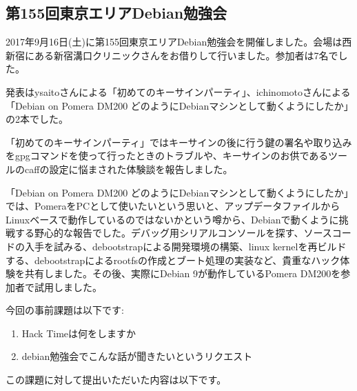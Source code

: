 \documentclass[mingoth,a4paper]{jsarticle}
\begin{document}

\subsection{第155回東京エリアDebian勉強会}

2017年9月16日(土)に第155回東京エリアDebian勉強会を開催しました。会場は西新宿にある新宿溝口クリニックさんをお借りして行いました。参加者は7名でした。

発表はysaitoさんによる「初めてのキーサインパーティ」、ichinomotoさんによる「Debian on Pomera DM200 どのようにDebianマシンとして動くようにしたか」の2本でした。


「初めてのキーサインパーティ」ではキーサインの後に行う鍵の署名や取り込みをgpgコマンドを使って行ったときのトラブルや、キーサインのお供であるツールのcaffの設定に悩まされた体験談を報告しました。


「Debian on Pomera DM200 どのようにDebianマシンとして動くようにしたか」では、PomeraをPCとして使いたいという思いと、アップデータファイルからLinuxベースで動作しているのではないかという噂から、Debianで動くように挑戦する野心的な報告でした。デバッグ用シリアルコンソールを探す、ソースコードの入手を試みる、debootstrapによる開発環境の構築、linux kernelを再ビルドする、debootstrapによるrootfsの作成とブート処理の実装など、貴重なハック体験を共有しました。その後、実際にDebian 9が動作しているPomera DM200を参加者で試用しました。



今回の事前課題は以下です:
\begin{enumerate}
\item Hack Timeは何をしますか
\item debian勉強会でこんな話が聞きたいというリクエスト
\end{enumerate}
この課題に対して提出いただいた内容は以下です。
\begin{multicols}{2}
{\small

}
\end{multicols}

%
%
%
%


\end{document}
